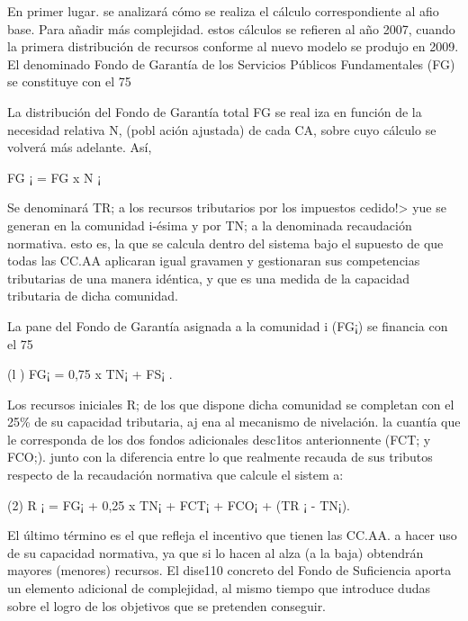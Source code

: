 \documentclass[10pt,a4paper]{article}
\begin{document}
En primer lugar. se analizará cómo se realiza el cálculo correspondiente al afio base. Para añadir más complejidad. estos cálculos se refieren al año 2007, cuando la primera distribución de recursos conforme al nuevo modelo se produjo en 2009. El denominado Fondo de Garantía de los Servicios Públicos Fundamentales (FG) se constituye con el 75%

La distribución del Fondo de Garantía total FG se real iza en función de la necesidad relativa N, (pobl ación ajustada) de cada CA, sobre cuyo cálculo se volverá más adelante. Así,

FG ¡ = FG x N ¡

Se denominará TR; a los recursos tributarios por los impuestos cedido!> yue se generan en la comunidad i-ésima y por TN; a la denominada recaudación normativa. esto es, la que se calcula dentro del sistema bajo el supuesto de que todas las CC.AA aplicaran igual gravamen y gestionaran sus competencias tributarias de una manera idéntica, y que es una medida de la capacidad tributaria de dicha comunidad.

La pane del Fondo de Garantía asignada a la comunidad i (FG¡) se financia con el 75%

(l ) FG¡ = 0,75 x TN¡ + FS¡ .

Los recursos iniciales R; de los que dispone dicha comunidad se completan con el 25\% de su capacidad tributaria, aj ena al mecanismo de nivelación. la cuantía que le corresponda de los dos fondos adicionales desc1itos anterionnente (FCT; y FCO;). junto con la diferencia entre lo que realmente recauda de sus tributos respecto de la recaudación normativa que calcule el sistem a:

(2) R ¡ = FG¡ + 0,25 x TN¡ + FCT¡ + FCO¡ + (TR ¡ - TN¡).

El último término es el que refleja el incentivo que tienen las CC.AA. a hacer uso de su capacidad normativa, ya que si lo hacen al alza (a la baja) obtendrán mayores (menores) recursos. El dise110 concreto del Fondo de Suficiencia aporta un elemento adicional de complejidad, al mismo tiempo que introduce dudas sobre el logro de los objetivos que se pretenden conseguir.
\end{document}
